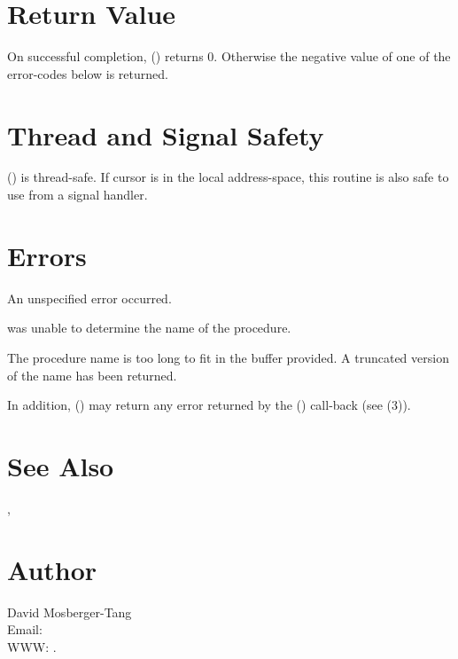 \documentclass{article}
\begin{document}
\section{Return Value}

On successful completion, () returns 0.
Otherwise the negative value of one of the error-codes below is
returned.

\section{Thread and Signal Safety}

() is thread-safe.  If cursor  is
in the local address-space, this routine is also safe to use from a
signal handler.

\section{Errors}

\begin{Description}
\item[\Const{UNW\_EUNSPEC}] An unspecified error occurred.
\item[\Const{UNW\_ENOINFO}]  was unable to determine
  the name of the procedure.
\item[\Const{UNW\_ENOMEM}] The procedure name is too long to fit
  in the buffer provided.  A truncated version of the name has been
  returned.
\end{Description}
In addition, () may return any error
returned by the () call-back (see
(3)).

\section{See Also}

,

\section{Author}

\noindent
David Mosberger-Tang\\
Email: \\
WWW: .
\LatexManEnd
\end{document}
